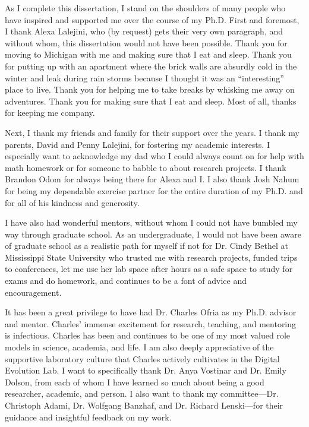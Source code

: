 
As I complete this dissertation, I stand on the shoulders of many people who have inspired and supported me over the course of my Ph.D.
First and foremost, I thank Alexa Lalejini, who (by request) gets their very own paragraph, and without whom, this dissertation would not have been possible. 
Thank you for moving to Michigan with me and making sure that I eat and sleep. 
Thank you for putting up with an apartment where the brick walls are absurdly cold in the winter and leak during rain storms because I thought it was an ``interesting'' place to live.
Thank you for helping me to take breaks by whisking me away on adventures. %
Thank you for making sure that I eat and sleep.
Most of all, thanks for keeping me company. 

Next, I thank my friends and family for their support over the years. 
I thank my parents, David and Penny Lalejini, for fostering my academic interests. %
I especially want to acknowledge my dad who I could always count on for help with math homework or for someone to babble to about research projects.
I thank Brandon Odom for always being there for Alexa and I.
I also thank Josh Nahum for being my dependable exercise partner for the entire duration of my Ph.D. and for all of his kindness and generosity. 

I have also had wonderful mentors, without whom I could not have bumbled my way through graduate school. %
As an undergraduate, I would not have been aware of graduate school as a realistic path for myself if not for Dr. Cindy Bethel at Mississippi State University who trusted me with research projects, funded trips to conferences, let me use her lab space after hours as a safe space to study for exams and do homework, and continues to be a font of advice and encouragement.

It has been a great privilege to have had Dr. Charles Ofria as my Ph.D. advisor and mentor.
Charles' immense excitement for research, teaching, and mentoring is infectious. 
Charles has been and continues to be one of my most valued role models in science, academia, and life.
I am also deeply appreciative of the supportive laboratory culture that Charles actively cultivates in the Digital Evolution Lab.
I want to specifically thank Dr. Anya Vostinar and Dr. Emily Dolson,
from each of whom I have learned so much about being a good researcher, academic, and person.
I also want to thank my committee---Dr. Christoph Adami, Dr. Wolfgang Banzhaf, and Dr. Richard Lenski---for their guidance and insightful feedback on my work. 

